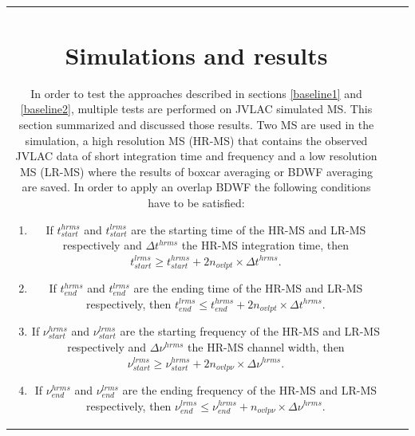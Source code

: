 \documentclass[useAMS,usenatbib]{mn2e}
\begin{document}
\begin{tabular}{*3{c}}
\section{Simulations and results}
In order to test the approaches described in sections \ref{baseline1} and \ref{baseline2}, multiple tests are performed on JVLAC 
simulated MS. This section summarized and discussed those results. Two MS are used in 
the simulation, a high resolution MS (HR-MS) that contains the observed JVLAC data of short integration time and frequency and a low 
resolution 
MS (LR-MS) where the results of boxcar averaging or BDWF averaging are saved. In order to apply an overlap BDWF  the following 
conditions have to be satisfied:
\begin{enumerate}
 \item If $t^{hrms}_{start}$ and $t^{lrms}_{start}$ are the starting time of the HR-MS and LR-MS respectively and  $\Delta t^{hrms}$ the 
HR-MS integration time, then 
	    $t^{lrms}_{start}\geq t^{hrms}_{start} + 2n_{ovlpt}\times \Delta t^{hrms}$. 
  \item If $t^{hrms}_{end}$ and $t^{lrms}_{end}$ are the ending time of the HR-MS and LR-MS respectively, then 
	    $t^{lrms}_{end}\leq t^{hrms}_{end} + 2n_{ovlpt}\times \Delta t^{hrms}$. 
 \item If $\nu^{hrms}_{start}$ and $\nu^{lrms}_{start}$ are the starting frequency of the HR-MS and LR-MS respectively and  $\Delta 
\nu^{hrms}$ the HR-MS channel width, then 
	    $\nu^{lrms}_{start} \geq \nu^{hrms}_{start} + 2n_{ovlp\nu}\times \Delta \nu^{hrms}$. 
 \item If $\nu^{hrms}_{end}$ and $\nu^{lrms}_{end}$ are the ending frequency of the HR-MS and LR-MS respectively, then 
	    $\nu^{lrms}_{end} \leq \nu^{hrms}_{end} + n_{ovlp\nu}\times \Delta \nu^{hrms}$. 
\end{enumerate}

\end{tabular}
\end{document}
